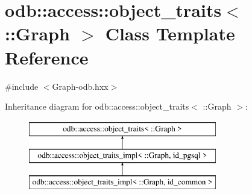 \hypertarget{classodb_1_1access_1_1object__traits_3_01_1_1_graph_01_4}{}\section{odb\+:\+:access\+:\+:object\+\_\+traits$<$ \+:\+:Graph $>$ Class Template Reference}
\label{classodb_1_1access_1_1object__traits_3_01_1_1_graph_01_4}


{\ttfamily \#include $<$Graph-\/odb.\+hxx$>$}

Inheritance diagram for odb\+:\+:access\+:\+:object\+\_\+traits$<$ \+:\+:Graph $>$\+:\begin{figure}[H]
\begin{center}
\leavevmode
\includegraphics[height=3.000000cm]{d5/d0b/classodb_1_1access_1_1object__traits_3_01_1_1_graph_01_4}
\end{center}
\end{figure}
